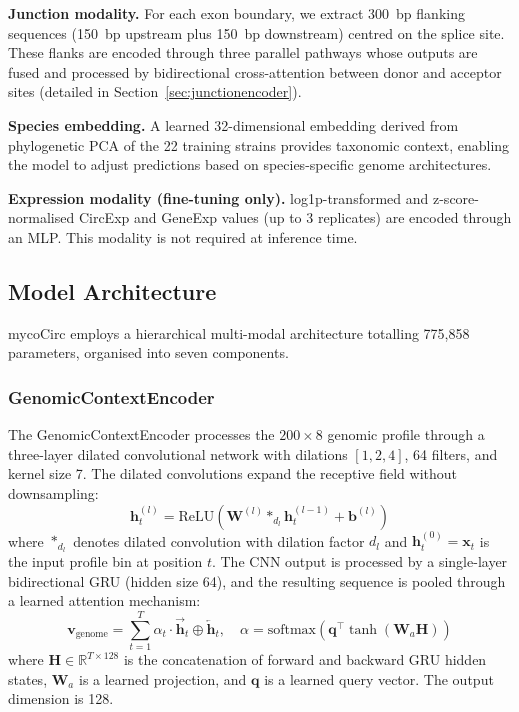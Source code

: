 \documentclass[12pt]{article}
\begin{document}
\textbf{Junction modality.} For each exon boundary, we extract 300~bp flanking sequences (150~bp upstream plus 150~bp downstream) centred on the splice site. These flanks are encoded through three parallel pathways whose outputs are fused and processed by bidirectional cross-attention between donor and acceptor sites (detailed in Section~\ref{sec:junctionencoder}).

\textbf{Species embedding.} A learned 32-dimensional embedding derived from phylogenetic PCA of the 22 training strains provides taxonomic context, enabling the model to adjust predictions based on species-specific genome architectures.

\textbf{Expression modality (fine-tuning only).} log1p-transformed and z-score-normalised CircExp and GeneExp values (up to 3 replicates) are encoded through an MLP. This modality is not required at inference time.

\subsection{Model Architecture}

mycoCirc employs a hierarchical multi-modal architecture totalling 775,858 parameters, organised into seven components.

\subsubsection{GenomicContextEncoder}

The GenomicContextEncoder processes the $200 \times 8$ genomic profile through a three-layer dilated convolutional network with dilations $[1, 2, 4]$, 64 filters, and kernel size 7. The dilated convolutions expand the receptive field without downsampling:
\begin{equation}
\mathbf{h}^{(l)}_t = \text{ReLU}\left(\mathbf{W}^{(l)} *_{d_l} \mathbf{h}^{(l-1)}_t + \mathbf{b}^{(l)}\right)
\end{equation}
where $*_{d_l}$ denotes dilated convolution with dilation factor $d_l$ and $\mathbf{h}^{(0)}_t = \mathbf{x}_t$ is the input profile bin at position $t$. The CNN output is processed by a single-layer bidirectional GRU (hidden size 64), and the resulting sequence is pooled through a learned attention mechanism:
\begin{equation}
\mathbf{v}_\text{genome} = \sum_{t=1}^{T} \alpha_t \cdot \overrightarrow{\mathbf{h}}_t \oplus \overleftarrow{\mathbf{h}}_t, \quad \alpha = \text{softmax}\left(\mathbf{q}^\top \tanh(\mathbf{W}_a \mathbf{H})\right)
\end{equation}
where $\mathbf{H} \in \mathbb{R}^{T \times 128}$ is the concatenation of forward and backward GRU hidden states, $\mathbf{W}_a$ is a learned projection, and $\mathbf{q}$ is a learned query vector. The output dimension is 128.
\end{document}
